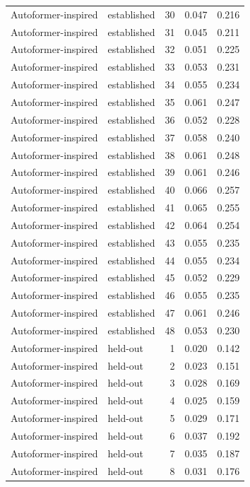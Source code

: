 \begin{tabular}{llrrr}
Autoformer-inspired & established & 30 & 0.047 & 0.216 \\
Autoformer-inspired & established & 31 & 0.045 & 0.211 \\
Autoformer-inspired & established & 32 & 0.051 & 0.225 \\
Autoformer-inspired & established & 33 & 0.053 & 0.231 \\
Autoformer-inspired & established & 34 & 0.055 & 0.234 \\
Autoformer-inspired & established & 35 & 0.061 & 0.247 \\
Autoformer-inspired & established & 36 & 0.052 & 0.228 \\
Autoformer-inspired & established & 37 & 0.058 & 0.240 \\
Autoformer-inspired & established & 38 & 0.061 & 0.248 \\
Autoformer-inspired & established & 39 & 0.061 & 0.246 \\
Autoformer-inspired & established & 40 & 0.066 & 0.257 \\
Autoformer-inspired & established & 41 & 0.065 & 0.255 \\
Autoformer-inspired & established & 42 & 0.064 & 0.254 \\
Autoformer-inspired & established & 43 & 0.055 & 0.235 \\
Autoformer-inspired & established & 44 & 0.055 & 0.234 \\
Autoformer-inspired & established & 45 & 0.052 & 0.229 \\
Autoformer-inspired & established & 46 & 0.055 & 0.235 \\
Autoformer-inspired & established & 47 & 0.061 & 0.246 \\
Autoformer-inspired & established & 48 & 0.053 & 0.230 \\
Autoformer-inspired & held-out & 1 & 0.020 & 0.142 \\
Autoformer-inspired & held-out & 2 & 0.023 & 0.151 \\
Autoformer-inspired & held-out & 3 & 0.028 & 0.169 \\
Autoformer-inspired & held-out & 4 & 0.025 & 0.159 \\
Autoformer-inspired & held-out & 5 & 0.029 & 0.171 \\
Autoformer-inspired & held-out & 6 & 0.037 & 0.192 \\
Autoformer-inspired & held-out & 7 & 0.035 & 0.187 \\
Autoformer-inspired & held-out & 8 & 0.031 & 0.176 \\

\end{tabular}
